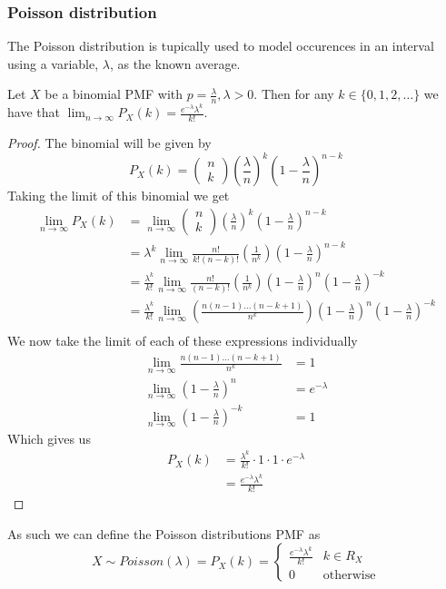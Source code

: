 \subsubsection{Poisson distribution}
The Poisson distribution is tupically used to model occurences in an interval using a variable, $\lambda$, as the known average.
\begin{theorem}
    Let $X$ be a binomial PMF with $p=\frac{\lambda}{n},\lambda>0$. Then for any $k\in\{0,1,2,\ldots\}$ we have that $\lim_{n\rightarrow\infty}P_{X}(k)=\frac{e^{-\lambda}\lambda^{k}}{k!}$.
\end{theorem}
\begin{proof}
  The binomial will be given by
  \[
    P_{X}(k)=\begin{pmatrix}n\\k\end{pmatrix}\left(\frac{\lambda}{n}\right)^{k}\left(1-\frac{\lambda}{n}\right)^{n-k}
  \]
  Taking the limit of this binomial we get
  \begin{align*}
      \lim_{n\rightarrow\infty}P_{X}(k)&=\lim_{n\rightarrow\infty}\begin{pmatrix}n\\k\end{pmatrix}\left(\frac{\lambda}{n}\right)^{k}\left(1-\frac{\lambda}{n}\right)^{n-k} \\
                        &=\lambda^{k}\lim_{n\rightarrow\infty}\frac{n!}{k!(n-k)!}\left(\frac{1}{n^{k}}\right)\left(1-\frac{\lambda}{n}\right)^{n-k} \\
                        &=\frac{\lambda^{k}}{k!}\lim_{n\rightarrow\infty}\frac{n!}{(n-k)!}\left(\frac{1}{n^{k}}\right)\left(1-\frac{\lambda}{n}\right)^{n}\left(1-\frac{\lambda}{n}\right)^{-k} \\
                        &=\frac{\lambda^{k}}{k!}\lim_{n\rightarrow\infty}\left(\frac{n(n-1)\ldots(n-k+1)}{n^{k}}\right)\left(1-\frac{\lambda}{n}\right)^{n}\left(1-\frac{\lambda}{n}\right)^{-k} \\
  \end{align*}
  We now take the limit of each of these expressions individually
  \begin{align*}
      \lim_{n\rightarrow\infty}\frac{n(n-1)\ldots(n-k+1)}{n^{k}}&=1 \\
      \lim_{n\rightarrow\infty}\left(1-\frac{\lambda}{n}\right)^{n}&=e^{-\lambda} \\
      \lim_{n\rightarrow\infty}\left(1-\frac{\lambda}{n}\right)^{-k}&=1 
  \end{align*}
  Which gives us
  \begin{align*}
      P_{X}(k)&=\frac{\lambda^{k}}{k!}\cdot 1\cdot 1\cdot e^{-\lambda} \\
              &=\frac{e^{-\lambda}\lambda^{k}}{k!}
  \end{align*}
\end{proof}
As such we can define the Poisson distributions PMF as
\[
    X\sim Poisson(\lambda)=P_{X}(k)=\begin{cases}\frac{e^{-\lambda}\lambda^{k}}{k!} & k\in R_X \\ 0 & \text{otherwise}\end{cases}
\]
